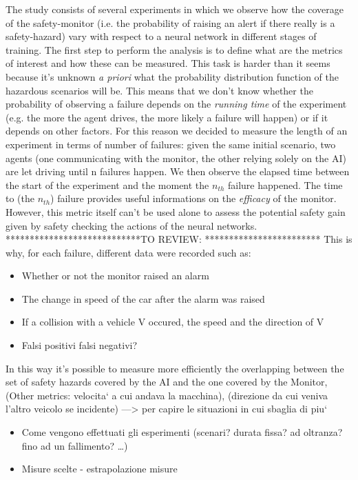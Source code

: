 The study consists of several experiments in which we observe how the coverage of the safety-monitor (i.e. the probability of raising an alert if there really is a safety-hazard) vary with respect to a neural network in different stages of training.\newline
The first step to perform the analysis is to define what are the metrics of interest and how these can be measured. This task is harder than it seems because it's unknown \textsl{a priori} what the probability distribution function of the hazardous scenarios will be. This means that we don't know whether the probability of observing a failure depends on the \textsl{running time} of the experiment (e.g. the more the agent drives, the more likely a failure will happen) or if it depends on other factors.\newline
For this reason we decided to measure the length of an experiment in terms of number of failures: given the same initial scenario, two agents (one communicating with the monitor, the other relying solely on the AI) are let driving until n failures happen. We then observe the elapsed time between the start of the experiment and the moment the $n_{th}$ failure happened.\newline
The time to (the $n_{th}$) failure provides useful informations on the \textsl{efficacy} of the monitor. However, this metric itself can't be used alone to assess the potential safety gain given by safety checking the actions of the neural networks. \newline *****************************\newline TO REVIEW: \newline *************************\newline
This is why, for each failure, different data were recorded such as:
\begin{itemize}
	\item Whether or not the monitor raised an alarm
	\item The change in speed of the car after the alarm was raised
	\item If a collision with a vehicle V occured, the speed and the direction of V
\end{itemize}

\begin{itemize}
	\item Falsi positivi falsi negativi?
\end{itemize}

In this way it's possible to measure more efficiently the overlapping between the set of safety hazards covered by the AI and the one covered by the Monitor,
(Other metrics: velocita` a cui andava la macchina), (direzione da cui veniva l'altro veicolo se incidente)
---> per capire le situazioni in cui sbaglia di piu`

	\begin{itemize}
		
		\item Come vengono effettuati gli esperimenti (scenari? durata fissa? ad oltranza? fino ad un fallimento? \dots)
		\item Misure scelte - estrapolazione misure
		
	\end{itemize}

